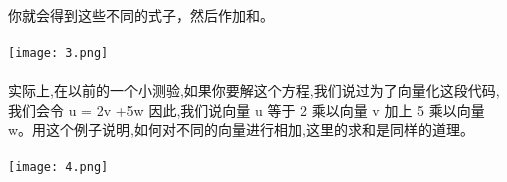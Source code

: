 \documentclass{article}
\begin{document}
\begin{CJK}{UTF8}{gbsn}
\paragraph{}
你就会得到这些不同的式子，然后作加和。
\paragraph{}
\texttt{[image: 3.png]}
\paragraph{}
实际上,在以前的一个小测验,如果你要解这个方程,我们说过为了向量化这段代码,我们会令 u = 2v +5w 因此,我们说向量 u 等于 2 乘以向量 v 加上 5 乘以向量 w。用这个例子说明,如何对不同的向量进行相加,这里的求和是同样的道理。
\paragraph{}
\texttt{[image: 4.png]}
\end{CJK}
\end{document}

